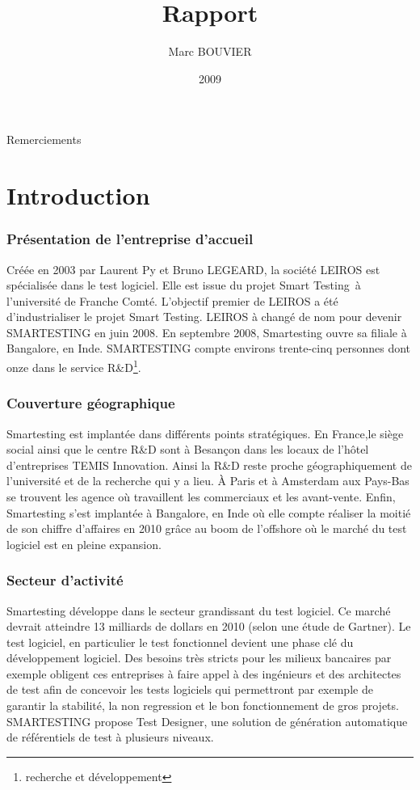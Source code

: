 \documentclass[12pt,oneside]{book}
\title{Rapport}
\author{Marc BOUVIER}
\date{2009}
\begin{document}
 
\pagebreak
Remerciements
\pagebreak
\tableofcontents{} %
\pagebreak
\listoffigures{}  %
\pagebreak
\part{Introduction}

\section{Présentation de l'entreprise d'accueil}
Créée en 2003 par Laurent Py et Bruno LEGEARD, la société LEIROS est spécialisée dans le test logiciel. Elle est issue du projet Smart Testing\texttrademark ~à l'université de Franche Comté. L'objectif premier de LEIROS a été d'industrialiser le projet Smart Testing\texttrademark.  LEIROS à changé de nom pour devenir SMARTESTING en juin 2008. En septembre 2008, Smartesting ouvre sa filiale à Bangalore, en Inde. SMARTESTING compte environs trente-cinq personnes dont onze dans le service R\&D{}\footnote{recherche et développement}.

\section{Couverture géographique}
Smartesting est implantée dans différents points stratégiques. En France,le siège social ainsi que le centre R\&D sont à Besançon dans les locaux de l'h\^otel d'entreprises TEMIS Innovation. Ainsi la R\&D reste proche géographiquement de l'université et de la recherche qui y a lieu.
\`A Paris et \`a Amsterdam aux Pays-Bas se trouvent les agence où travaillent les commerciaux et les avant-vente.
Enfin, Smartesting s'est implantée à Bangalore, en Inde où elle compte réaliser la moitié de son chiffre d'affaires en 2010 gr\^ace au boom de l'offshore o\`u le marché du test logiciel est en pleine expansion.

\section{Secteur d'activité}
Smartesting développe dans le secteur grandissant du test logiciel. Ce marché devrait atteindre 13 milliards de dollars en 2010 (selon une étude de Gartner). Le test logiciel, en particulier le test fonctionnel devient une phase clé du développement logiciel. Des besoins très stricts pour les milieux bancaires par exemple obligent ces entreprises à faire appel à des ingénieurs et des architectes de test afin de concevoir les tests logiciels qui permettront par exemple de garantir la stabilité, la non regression et le bon fonctionnement de gros projets. SMARTESTING propose Test Designer, une solution de génération automatique de référentiels de test à plusieurs niveaux.
\end{document}
